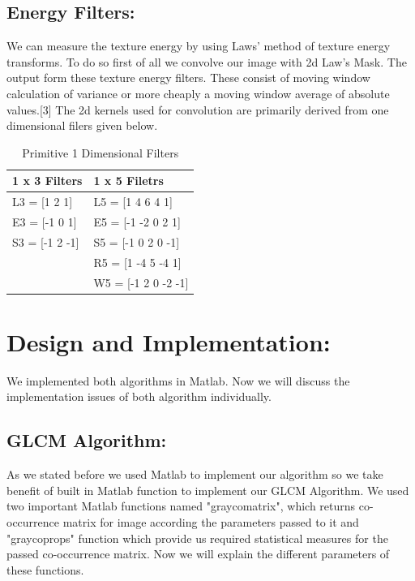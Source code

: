 \documentclass{article}
\begin{document}
\subsection{Energy Filters:}
We can measure the texture energy by using Laws' method of texture
energy transforms. To do so first of all we convolve our image with 2d Law's Mask. The output form these texture energy filters. These consist of moving window calculation of variance or more cheaply a moving window average of absolute values.[3] The 2d kernels used for convolution are primarily derived from one dimensional filers given below.
\begin{table}[H]
    \begin{tabular}{|l|l|}
    \hline
    1 x 3 Filters  & 1 x 5 Filetrs       \\ \hline
    L3 = [1 2 1]   & L5 = [1 4 6 4 1]    \\ \hline
    E3 = [-1 0 1]  & E5 = [-1 -2 0 2 1]  \\ \hline
    S3 = [-1 2 -1] & S5 = [-1 0 2 0 -1]  \\ \hline
    ~              & R5 = [1 -4 5 -4 1]  \\ \hline
    ~              & W5 = [-1 2 0 -2 -1] \\ \hline
    \end{tabular}
    \caption{Primitive 1 Dimensional Filters}
\end{table}
\section{Design and Implementation:}
We implemented both algorithms in Matlab. Now we will discuss the implementation issues of both algorithm individually.
\subsection{GLCM Algorithm:}
As we stated before we used Matlab to implement our algorithm so we take benefit of built in Matlab function to implement our GLCM Algorithm. We  used two important Matlab functions named "graycomatrix", which returns co-occurrence matrix for image according the parameters passed to it and "graycoprops" function which provide us required statistical measures for the passed co-occurrence matrix. Now we will explain the different parameters of these functions.
\end{document}
